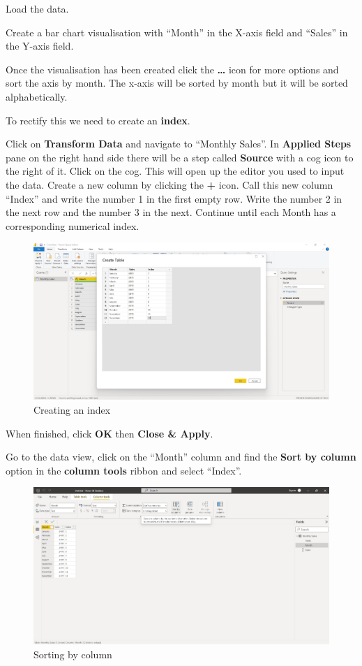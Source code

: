 \documentclass[
]{book}
\begin{document}
Load the data.

Create a bar chart visualisation with ``Month'' in the X-axis field and ``Sales'' in the Y-axis field.

Once the visualisation has been created click the \textbf{\ldots{}} icon for more options and sort the axis by month. The x-axis will be sorted by month but it will be sorted alphabetically.

To rectify this we need to create an \textbf{index}.

Click on \textbf{Transform Data} and navigate to ``Monthly Sales''. In \textbf{Applied Steps} pane on the right hand side there will be a step called \textbf{Source} with a cog icon to the right of it. Click on the cog. This will open up the editor you used to input the data. Create a new column by clicking the \textbf{+} icon. Call this new column ``Index'' and write the number 1 in the first empty row. Write the number 2 in the next row and the number 3 in the next. Continue until each Month has a corresponding numerical index.

\begin{figure}
\centering
\includegraphics{bi15.jpg}
\caption{Creating an index}
\end{figure}

When finished, click \textbf{OK} then \textbf{Close \& Apply}.

Go to the data view, click on the ``Month'' column and find the \textbf{Sort by column} option in the \textbf{column tools} ribbon and select ``Index''.

\begin{figure}
\centering
\includegraphics{bi16.jpg}
\caption{Sorting by column}
\end{figure}
\end{document}
